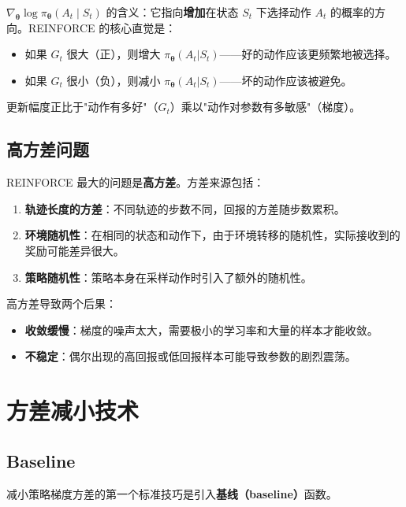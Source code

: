 \begin{remark}
$\nabla_{\boldsymbol{\theta}} \log \pi_{\boldsymbol{\theta}}(A_t \mid S_t)$ 的含义：它指向\textbf{增加}在状态 $S_t$ 下选择动作 $A_t$ 的概率的方向。REINFORCE 的核心直觉是：
\begin{itemize}
    \item 如果 $G_t$ 很大（正），则增大 $\pi_{\boldsymbol{\theta}}(A_t|S_t)$——好的动作应该更频繁地被选择。
    \item 如果 $G_t$ 很小（负），则减小 $\pi_{\boldsymbol{\theta}}(A_t|S_t)$——坏的动作应该被避免。
\end{itemize}
更新幅度正比于"动作有多好"（$G_t$）乘以"动作对参数有多敏感"（梯度）。
\end{remark}

\subsection{高方差问题}

REINFORCE 最大的问题是\textbf{高方差}。方差来源包括：

\begin{enumerate}
    \item \textbf{轨迹长度的方差}：不同轨迹的步数不同，回报的方差随步数累积。
    \item \textbf{环境随机性}：在相同的状态和动作下，由于环境转移的随机性，实际接收到的奖励可能差异很大。
    \item \textbf{策略随机性}：策略本身在采样动作时引入了额外的随机性。
\end{enumerate}

高方差导致两个后果：
\begin{itemize}
    \item \textbf{收敛缓慢}：梯度的噪声太大，需要极小的学习率和大量的样本才能收敛。
    \item \textbf{不稳定}：偶尔出现的高回报或低回报样本可能导致参数的剧烈震荡。
\end{itemize}

\section{方差减小技术}

\subsection{Baseline}

减小策略梯度方差的第一个标准技巧是引入\textbf{基线（baseline）}函数。

